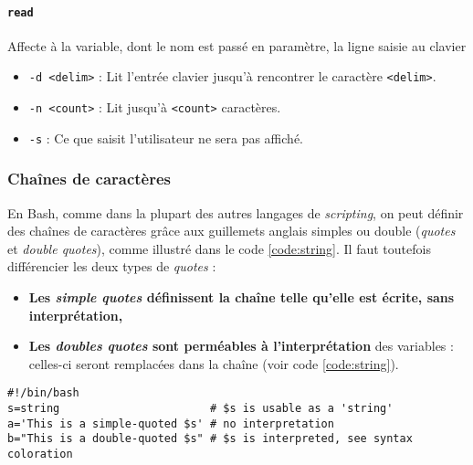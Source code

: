 \paragraph{\texttt{read}} 
Affecte à la variable, dont le nom est passé en paramètre, la ligne saisie au clavier
\begin{itemize}
    \item \texttt{-d <delim>} : Lit l'entrée clavier jusqu'à rencontrer le caractère \texttt{<delim>}.
    \item \texttt{-n <count>} : Lit jusqu'à \texttt{<count>} caractères.
    \item \texttt{-s} : Ce que saisit l'utilisateur ne sera pas affiché.
\end{itemize}

\newpage

\subsubsection{Chaînes de caractères} \label{sec:string}
En Bash, comme dans la plupart des autres langages de \textit{scripting}, on peut définir des chaînes de caractères grâce aux guillemets anglais simples ou double (\textit{quotes} et \textit{double quotes}), comme illustré dans le code \ref{code:string}. Il faut toutefois différencier les deux types de \textit{quotes} : 
\begin{itemize}
    \item \textbf{Les \textit{simple quotes} définissent la chaîne telle qu'elle est écrite, sans interprétation,}
    \item \textbf{Les \textit{doubles quotes} sont perméables à l'interprétation} des variables : celles-ci seront remplacées dans la chaîne (voir code \ref{code:string}).
\end{itemize}

\vspace{5mm}
\begin{code}
    \begin{verbatim}
#!/bin/bash
s=string                       # $s is usable as a 'string'
a='This is a simple-quoted $s' # no interpretation
b="This is a double-quoted $s" # $s is interpreted, see syntax coloration
    \end{verbatim}

    \vspace{-0.5cm}
    \label{code:string}
\end{code}


